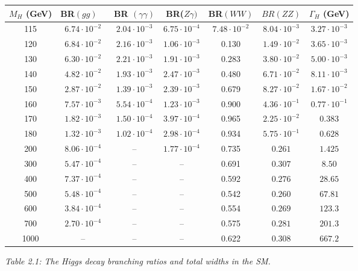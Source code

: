 \begin{table}[htbp]
\begin{center}
\renewcommand{\arraystretch}{1.25}
\begin{tabular}{|c||c|c|c|c|c||c|}\hline
$M_H$ (GeV) & BR$(gg)$ \ & BR $(\gamma \gamma)$ & BR($Z \gamma)$ & BR$(WW)$ & 
$BR(ZZ)$  & $\Gamma_H$ (GeV) \\ \hline \hline
115 & $6.74 \cdot\! 10^{-2}$ & $2.04 \cdot\! 10^{-3}$ & $6.75 \cdot\! 10^{-4}$ 
& $7.48 \cdot\! 10^{-2}$ & $8.04 \cdot\! 10^{-3}$ & $3.27 \cdot \! 10^{-3}$\\
%
120 & $6.84 \cdot\! 10^{-2}$ & $2.16 \cdot\! 10^{-3}$ & $1.06 \cdot\! 10^{-3}$ 
& 0.130& $1.49 \cdot\! 10^{-2}$ & $3.65 \cdot \! 10^{-3}$\\
%
130 & $6.30 \cdot\! 10^{-2}$ & $2.21 \cdot\! 10^{-3}$ & $1.91 \cdot\! 10^{-3}$ 
& $0.283$ & $3.80 \cdot\! 10^{-2}$ & $5.00 \cdot \! 10^{-3}$\\
%
140 & $4.82 \cdot\! 10^{-2}$ & $1.93 \cdot\! 10^{-3}$ & $2.47 \cdot\! 10^{-3}$ 
& 0.480 & $6.71 \cdot\! 10^{-2}$ & $8.11 \cdot \! 10^{-3}$\\
%
150 & $2.87 \cdot\! 10^{-2}$ & $1.39 \cdot\! 10^{-3}$ & $2.39 \cdot\! 10^{-3}$ 
& 0.679 & $8.27 \cdot\! 10^{-2}$ & $1.67 \cdot \! 10^{-2}$\\
%
160 &  $7.57 \cdot\! 10^{-3}$ & $5.54 \cdot\! 10^{-4}$ & $1.23 \cdot\! 10^{-3}$ 
& 0.900 & $4.36 \cdot\! 10^{-1}$ & $0.77 \cdot \! 10^{-1}$\\
%
170 &  $1.82 \cdot\! 10^{-3}$ & $1.50 \cdot\! 10^{-4}$ & $3.97 \cdot\! 10^{-4}$ 
& 0.965 & $2.25 \cdot\! 10^{-2}$ & $0.383$ \\
%
180 & $1.32 \cdot\! 10^{-3}$ & $1.02 \cdot\! 10^{-4}$ & $2.98 \cdot\! 10^{-4}$ 
& 0.934 & $5.75 \cdot\! 10^{-1}$ & $0.628$ \\
%
200 & $8.06 \cdot\! 10^{-4}$ & -- & $1.77 \cdot\! 10^{-4}$ 
& 0.735 & $0.261$ & $1.425$ \\
%
300 & $5.47 \cdot\! 10^{-4}$ & -- & --& 0.691 & $0.307$ & $8.50$ \\
%
400 & $7.37 \cdot\! 10^{-4}$ & -- & --& 0.592 & $0.276$ & $28.65$ \\
%
500 & $5.48 \cdot\! 10^{-4}$ & -- & --& 0.542 & $0.260$ & $67.81$ \\
%
600 & $3.84 \cdot\! 10^{-4}$ & -- & --& 0.554 & $0.269$ & $123.3$ \\
%
700 & $2.70 \cdot\! 10^{-4}$ & -- & --& 0.575 & $0.281$ & $201.3$ \\
%
1000 & -- & -- & --& 0.622 & $0.308$ & $667.2$ \\
\hline
\end{tabular}
\end{center}
\vspace*{0mm}
\centerline{\it Table 2.1: The Higgs decay branching ratios and total widths in the SM.}
\end{table}


